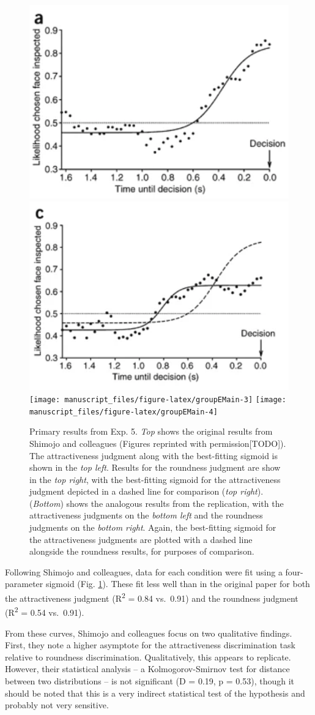 \documentclass[
  man,floatsintext]{apa6}
\begin{document}
\begin{figure}
\includegraphics[width=0.45\linewidth]{figGroupEOrigA} \includegraphics[width=0.45\linewidth]{figGroupEOrigB} \texttt{[image: manuscript\_files/figure-latex/groupEMain-3]} \texttt{[image: manuscript\_files/figure-latex/groupEMain-4]} \caption{Primary results from Exp. 5. \emph{Top} shows the original results from Shimojo and colleagues (Figures reprinted with permission{[}TODO{]}). The attractiveness judgment along with the best-fitting sigmoid is shown in the \emph{top left}. Results for the roundness judgment are show in the \emph{top right}, with the best-fitting sigmoid for the attractiveness judgment depicted in a dashed line for comparison (\emph{top right}). (\emph{Bottom}) shows the analogous results from the replication, with the attractiveness judgments on the \emph{bottom left} and the roundness judgments on the \emph{bottom right}. Again, the best-fitting sigmoid for the attractiveness judgments are plotted with a dashed line alongside the roundness results, for purposes of comparison.}\label{fig:groupEMain}
\end{figure}

Following Shimojo and colleagues, data for each condition were fit using a four-parameter sigmoid (Fig. \ref{fig:groupEMain}). These fit less well than in the original paper for both the attractiveness judgment (R\textsuperscript{2} = 0.84 vs.~0.91) and the roundness judgment (R\textsuperscript{2} = 0.54 vs.~0.91).

From these curves, Shimojo and colleagues focus on two qualitative findings. First, they note a higher asymptote for the attractiveness discrimination task relative to roundness discrimination. Qualitatively, this appears to replicate. However, their statistical analysis -- a Kolmogorov-Smirnov test for distance between two distributions -- is not significant (D = 0.19, p = 0.53), though it should be noted that this is a very indirect statistical test of the hypothesis and probably not very sensitive.
\end{document}
